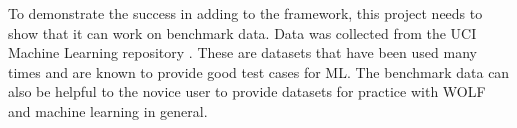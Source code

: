 To demonstrate the success in adding to the framework, this project needs to show that it can work on benchmark data. Data was collected from the UCI Machine Learning repository \parencite{UCIdata}. These are datasets that have been used many times and are known to provide good test cases for ML. The benchmark data can also be helpful to the novice user to provide datasets for practice with WOLF and machine learning in general.